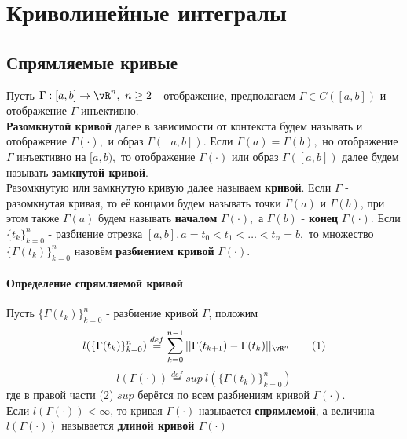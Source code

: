 \documentclass[main]{subfiles}
\begin{document}
\chapter{Криволинейные интегралы}

\section{Спрямляемые кривые}
\begin{definition}
    Пусть $\Gamma:[a,b]\rightarrow {\vR^n},\ n\geq 2$ - отображение, предполагаем $\Gamma\in C([a,b])$ и отображение $\Gamma$ инъективно.\\
    \textbf{Разомкнутой кривой} далее в зависимости от контекста будем называть и отображение $\Gamma(\cdot),$ и образ $\Gamma([a,b])$.
    Если $\Gamma(a)=\Gamma(b),$ но отображение $\Gamma$ инъективно на $[a,b),$ то отображение $\Gamma(\cdot)$ или образ $\Gamma([a,b])$
    далее будем называть \textbf{замкнутой кривой}. \\ Разомкнутую или замкнутую кривую далее называем \textbf{кривой}.
    Если $\Gamma$ - разомкнутая кривая, то её концами будем называть точки $\Gamma(a)$ и $\Gamma(b)$,
    при этом также $\Gamma(a)$ будем называть \textbf{началом} $\Gamma(\cdot),$ а $\Gamma(b)$ -
    \textbf{конец} $\Gamma(\cdot).$ Если $\{ t_k\}^n_{k=0}$ - разбиение отрезка
    $[a,b], a=t_0<t_1<\dots<t_n=b,$ то множество $\{ \Gamma(t_k)\}_{k=0}^n$ назовём \textbf{разбиением кривой} $\Gamma(\cdot)$.
\end{definition}


\subsubsection{Определение спрямляемой кривой}
Пусть $\{ \Gamma(t_k)\}^n_{k=0}$ - разбиение кривой $\Gamma$, положим
\[ l(\{\Gamma(t_k)\}^n_{k=0})\stackrel{def}{=}\sum\limits_{k=0}^{n-1}|| \Gamma(t_{k+1})-\Gamma(t_k)||_{\vR^n} \tag{1} \]
\[ l(\Gamma(\cdot))\overset{def}{=}sup\ l(\{\Gamma(t_k)\}^n_{k=0}) \tag{2} \]
где в правой части (2) $sup$ берётся по всем разбиениям кривой $\Gamma(\cdot).$\\
Если $l(\Gamma(\cdot))<\infty$, то кривая $\Gamma(\cdot)$ называется \textbf{спрямлемой}, а величина $l(\Gamma(\cdot))$ называется \textbf{длиной кривой $\Gamma(\cdot)$}
\end{document}
